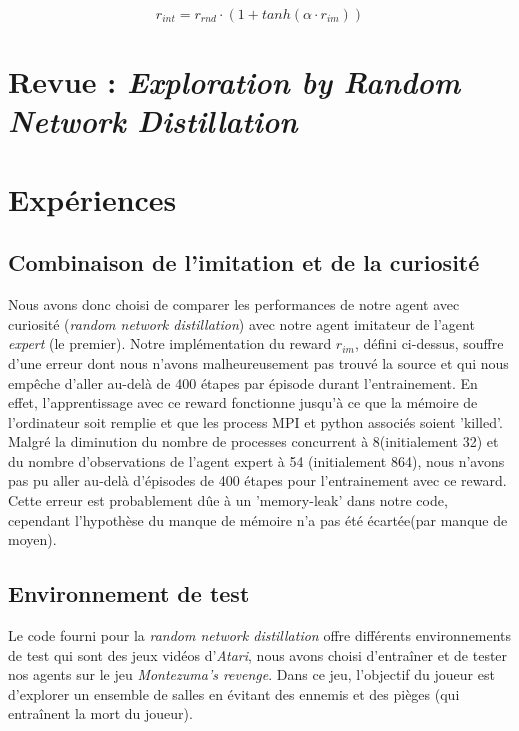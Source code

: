\documentclass[a4paper,12pt]{report}
\begin{document}
\begin{equation} r_{int} = r_{rnd} \cdot (1 + tanh(\alpha \cdot r_{im})) \end{equation}

\newpage \section{Revue : \textit{Exploration by Random Network Distillation}}
\label{revue_distillation}

\newpage \section{Expériences}
\subsection{Combinaison de l'imitation et de la curiosité}
Nous avons donc choisi de comparer les performances de notre agent avec curiosité (\textit{random network distillation}) avec notre agent imitateur de l'agent \textit{expert} (le premier).
Notre implémentation du reward $r_{im}$, défini ci-dessus, souffre d'une erreur dont nous n'avons malheureusement pas trouvé la source et qui nous empêche d'aller au-delà de 400 étapes par épisode durant l'entrainement.
En effet, l'apprentissage avec ce reward fonctionne jusqu'à ce que la mémoire de l'ordinateur soit remplie et que les process MPI et python associés soient 'killed'.
Malgré la diminution du nombre de processes concurrent à 8(initialement 32) et du nombre d'observations de l'agent expert à 54 (initialement 864), nous n'avons pas pu aller au-delà d'épisodes de 400 étapes pour l'entrainement avec ce reward.
Cette erreur est probablement dûe à un 'memory-leak' dans notre code, cependant l'hypothèse du manque de mémoire n'a pas été écartée(par manque de moyen).

\subsection{Environnement de test}
Le code fourni pour la \textit{random network distillation} offre différents environnements de test qui sont des jeux vidéos d'\textit{Atari}, nous avons choisi d'entraîner et de tester nos agents sur le jeu \textit{Montezuma's revenge}\cite{montezuma}. Dans ce jeu, l'objectif du joueur est d'explorer un ensemble de salles en évitant des ennemis et des pièges (qui entraînent la mort du joueur).
\end{document}
